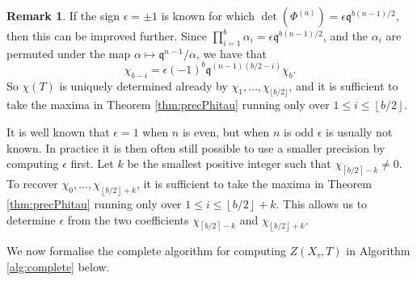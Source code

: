 \documentclass[a4paper,11pt]{article}
\numberwithin{equation}{section}
\providecommand{\floor}[1]{\left\lfloor#1\right\rfloor}   %
\providecommand{\ceil}[1]{\left\lceil#1\right\rceil}   %
\theoremstyle{definition}
\newtheorem{rem}[thm]{Remark}
\begin{document}
\begin{rem}
If  the sign $\epsilon = \pm 1$ is known for which $\det(\Phi^{(a)}) = \epsilon \mathfrak{q}^{b(n-1)/2}$, 
then this can be improved further. Since $\prod_{i=1}^b \alpha_i = \epsilon \mathfrak{q}^{b(n-1)/2}$, and 
the $\alpha_i$ are permuted under the map $\alpha \mapsto \mathfrak{q}^{n-1}/\alpha$, we have that
\begin{equation*}
\chi_{b-i}=\epsilon (-1)^{b} \mathfrak{q}^{(n-1)(b/2-i)} \chi_b. 
\end{equation*}
So $\chi(T)$ is uniquely determined already by $\chi_1,\dotsc,\chi_{\lfloor b/2 \rfloor}$,
and it is sufficient to take the maxima in Theorem \ref{thm:precPhitau} running only over
$1 \leq i \leq \floor{b/2}$.

It is well known that $\epsilon = 1$ when $n$ is even, but when $n$ is odd
$\epsilon$ is usually not known. In practice it is then often still possible 
to use a smaller precision by computing $\epsilon$ first. Let $k$ be the smallest 
positive integer such that $\chi_{\ceil{b/2} - k} \neq 0$. 
To recover $\chi_0, \dotsc, \chi_{\floor{b/2}+k}$, it is sufficient to take the maxima 
in Theorem \ref{thm:precPhitau} running only over $1 \leq i \leq \floor{b/2}+k$. 
This allows us to determine $\epsilon$ from the two coefficients $\chi_{\ceil{b/2}-k}$ and 
$\chi_{\floor{b/2}+k}$. 
\end{rem}

We now formalise the complete algorithm for computing $Z(X_{\tau},T)$ in Algorithm \ref{alg:complete}
below.
\end{document}
